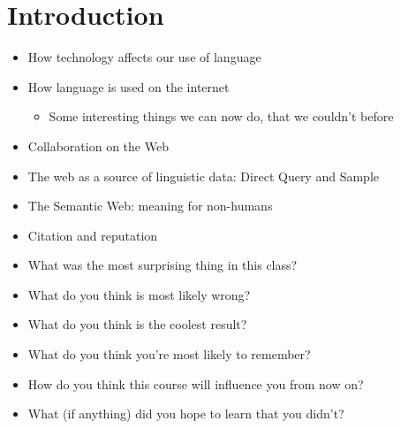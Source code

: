 \documentclass[a4paper,landscape,headrule,footrule,xetex]{foils}
\begin{document}


\maketitle




\section{Introduction}


\begin{itemize}
\item How technology affects our use of language
 \item How language is used on the internet
   \begin{itemize}
   \item Some interesting things we can now do, that we couldn't before 
   \end{itemize}
 \item Collaboration on the Web
 \item The web as a source of linguistic data: Direct Query and Sample
 \item The Semantic Web: meaning for non-humans
 \item Citation and reputation
\end{itemize}

\begin{itemize}
\item What was the most surprising thing in this class?
\item What do you think is most likely wrong?
\item What do you think is the coolest result?
\item What do you think you’re most likely to
remember?
\item How do you think this course will influence you from now on?
\item What (if anything) did you hope to learn that you didn't?
\end{itemize}
\end{document}

